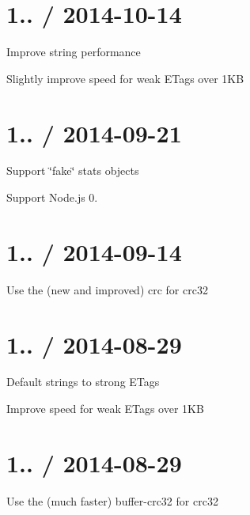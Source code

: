 \section*{1.. / 2014-\/10-\/14 }


\begin{DoxyItemize}
\item Improve string performance
\item Slightly improve speed for weak E\+Tags over 1\+KB
\end{DoxyItemize}

\section*{1.. / 2014-\/09-\/21 }


\begin{DoxyItemize}
\item Support \char`\"{}fake\char`\"{} stats objects
\item Support Node.\+js 0.
\end{DoxyItemize}

\section*{1.. / 2014-\/09-\/14 }


\begin{DoxyItemize}
\item Use the (new and improved) {\ttfamily crc} for crc32
\end{DoxyItemize}

\section*{1.. / 2014-\/08-\/29 }


\begin{DoxyItemize}
\item Default strings to strong E\+Tags
\item Improve speed for weak E\+Tags over 1\+KB
\end{DoxyItemize}

\section*{1.. / 2014-\/08-\/29 }


\begin{DoxyItemize}
\item Use the (much faster) {\ttfamily buffer-\/crc32} for crc32
\end{DoxyItemize}

